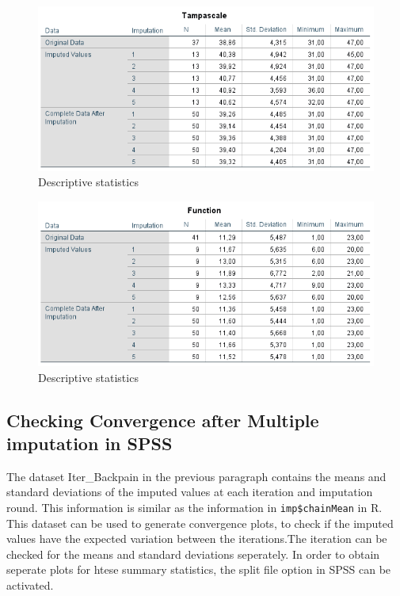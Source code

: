 \documentclass[]{book}
\theoremstyle{definition}
\theoremstyle{definition}
\theoremstyle{definition}
\theoremstyle{remark}
\begin{document}
\begin{figure}

{\centering \includegraphics[width=0.9\linewidth]{images/tab4.7} 

}

\caption{Descriptive statistics}\label{fig:tab4-7}
\end{figure}\begin{figure}

{\centering \includegraphics[width=0.9\linewidth]{images/tab4.8} 

}

\caption{Descriptive statistics}\label{fig:tab4-7}
\end{figure}

\subsection{Checking Convergence after Multiple imputation in
SPSS}\label{checking-convergence-after-multiple-imputation-in-spss}

The dataset Iter\_Backpain in the previous paragraph contains the means
and standard deviations of the imputed values at each iteration and
imputation round. This information is similar as the information in
\texttt{imp\$chainMean} in R. This dataset can be used to generate
convergence plots, to check if the imputed values have the expected
variation between the iterations.The iteration can be checked for the
means and standard deviations seperately. In order to obtain seperate
plots for htese summary statistics, the split file option in SPSS can be
activated.
\end{document}
